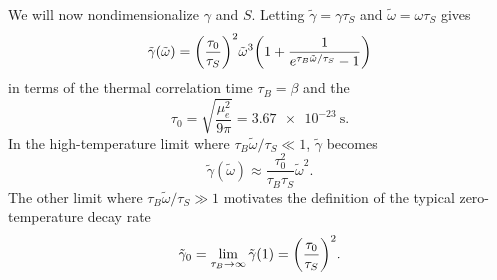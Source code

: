 \documentclass[../thesis.tex]{subfiles}
\begin{document}
We will now nondimensionalize $\gamma$ and $S$. Letting $\tilde{\gamma} = \gamma
\tau_S$ and $\tilde{\omega} = \omega\tau_S$ gives
\begin{equation}
  \tilde{\gamma}(\tilde{\omega})
  = {\qty(\frac{\tau_0}{\tau_S})}^2 \tilde{\omega}^3
  \qty(1 + \frac{1}{e^{\tau_B \tilde{\omega} / \tau_S} - 1})
  \label{eq:gamma-nondim}
\end{equation}
in terms of the thermal correlation time $\tau_B = \beta$ and the
\begin{equation}
  \tau_0
  = \sqrt{\frac{\mu_e^2}{9\pi}}
  = \SI{3.67e-23}{\s}.
\end{equation}
In the high-temperature limit where $\tau_B\tilde{\omega}/\tau_S \ll 1$,
$\tilde{\gamma}$ becomes
\begin{equation}
  \tilde{\gamma}(\tilde{\omega})
  \approx \frac{\tau_0^2}{\tau_B \tau_S} \tilde{\omega}^2.
\end{equation}
The other limit where $\tau_B\tilde{\omega}/\tau_S \gg 1$ motivates the
definition of the typical zero-temperature decay rate
\begin{equation}
  \tilde{\gamma}_0
  = \lim_{\tau_B \to \infty} \tilde{\gamma}(1)
  = {\qty(\frac{\tau_0}{\tau_S})}^2.
\end{equation}
\end{document}
